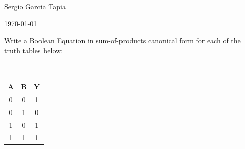\documentclass[12pt]{article}
\newenvironment{ex}[2][Exercise]{\begin{trivlist}
		\item[\hskip \labelsep {\bfseries #1}\hskip \labelsep {\bfseries #2.}]}{\end{trivlist}}
\begin{document}

\noindent Sergio Garcia Tapia \hfill

 \hfill 

\noindent\today

\begin{ex}{2.1}
	Write a Boolean Equation in sum-of-products canonical form for each of the truth tables below: \
	\begin{center}
		\begin{enumerate*}[label=(\alph*)]
			\item \
			\begin{tabular}{cc|c}
				A & B & Y \\
				\hline
				0 & 0 & 1 \\
				0 & 1 & 0 \\
				1 & 0 & 1 \\
				1 & 1 & 1 \\
			\end{tabular}
			\item \
			

\end{enumerate*}
\end{center}
\end{ex}
\end{document}
